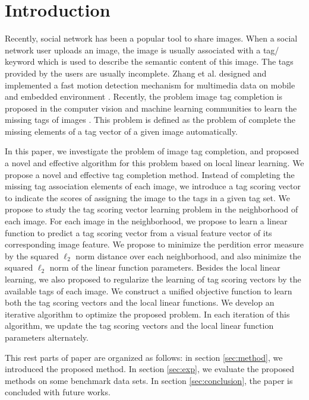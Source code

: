 \documentclass[runningheads,a4paper]{llncs}
\begin{document}
\section{Introduction}

Recently, social network has been a popular tool to share images. When a social network user uploads an image, the image is usually associated with a tag/ keyword which is used to describe the semantic content of this image. The tags provided by the users are usually incomplete. Zhang et al. designed and implemented a fast motion detection mechanism for multimedia data on mobile and embedded environment \cite{zhang2014lucas}. Recently, the problem image tag completion is proposed in the computer vision and machine learning communities to learn the missing tags of images \cite{Wu2013716,Lin20131618,Lin201442,Feng2014424,Xia2014,liu2015supervised,wang2015representing}. This problem is defined as the problem of complete the missing elements of a tag vector of a given image automatically.

In this paper, we investigate the problem of image tag completion, and proposed a novel and effective algorithm for this problem based on local linear learning.
We propose a novel and effective tag completion method. Instead of completing the missing tag association elements of each image, we introduce a tag scoring vector to indicate the scores of assigning the image to the tags in a given tag set. We propose to study the tag scoring vector learning problem in the neighborhood of each image. For each image in the neighborhood, we propose to learn a linear function to predict a tag scoring vector from a visual feature vector of its corresponding image feature. We propose to minimize the perdition error measure by the squared $\ell_2$ norm distance over each neighborhood, and also minimize the squared $\ell_2$ norm of the linear function parameters. Besides the local linear learning, we also proposed to regularize the learning of tag scoring vectors by the available tags of each image. We construct a unified objective function to learn both the tag scoring vectors and the  local linear functions. We develop an iterative algorithm to optimize the proposed problem. In each iteration of this algorithm, we update the tag scoring vectors and the local linear function parameters alternately.

This rest parts of  paper are organized as follows: in section \ref{sec:method}, we introduced the proposed method. In section \ref{sec:exp}, we evaluate the proposed methods on some benchmark data sets. In section \ref{sec:conclusion}, the paper is concluded with future works.
\end{document}
